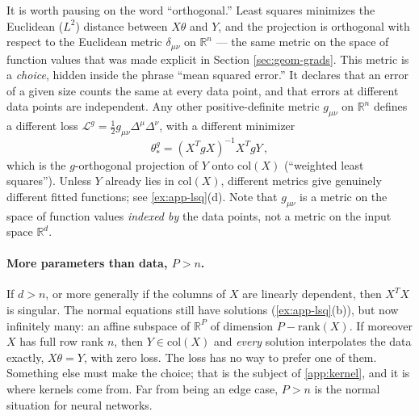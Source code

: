 \documentclass[11pt]{article}
\newcommand{\R}{\mathbb{R}}
\newcommand{\CL}{{\mathcal L}}
\begin{document}
It is worth pausing on the word ``orthogonal.'' Least squares minimizes the Euclidean ($L^2$) distance between $X\theta$ and $Y$, and the projection is orthogonal with respect to the Euclidean metric $\delta_{\mu\nu}$ on $\R^n$ --- the same metric on the space of function values that was made explicit in Section \ref{sec:geom-grads}. This metric is a \emph{choice}, hidden inside the phrase ``mean squared error.'' It declares that an error of a given size counts the same at every data point, and that errors at different data points are independent. Any other positive-definite metric $g_{\mu\nu}$ on $\R^n$ defines a different loss $\CL^g = \frac{1}{2} g_{\mu\nu}\Delta^\mu\Delta^\nu$, with a different minimizer
%
\begin{equation}
    \theta_*^g = (X^TgX)^{-1}X^TgY\,, \label{app-wls}
\end{equation}
%
which is the $g$-orthogonal projection of $Y$ onto $\mathrm{col}(X)$ (``weighted least squares''). Unless $Y$ already lies in $\mathrm{col}(X)$, different metrics give genuinely different fitted functions; see \cref{ex:app-lsq}(d). Note that $g_{\mu\nu}$ is a metric on the space of function values \emph{indexed by} the data points, not a metric on the input space $\R^d$.

\paragraph{More parameters than data, $P>n$.} If $d>n$, or more generally if the columns of $X$ are linearly dependent, then $X^TX$ is singular. The normal equations still have solutions (\cref{ex:app-lsq}(b)), but now infinitely many: an affine subspace of $\R^P$ of dimension $P-\mathrm{rank}(X)$. If moreover $X$ has full row rank $n$, then $Y\in\mathrm{col}(X)$ and \emph{every} solution interpolates the data exactly, $X\theta = Y$, with zero loss. The loss has no way to prefer one of them. Something else must make the choice; that is the subject of \cref{app:kernel}, and it is where kernels come from. Far from being an edge case, $P>n$ is the normal situation for neural networks.
\end{document}
